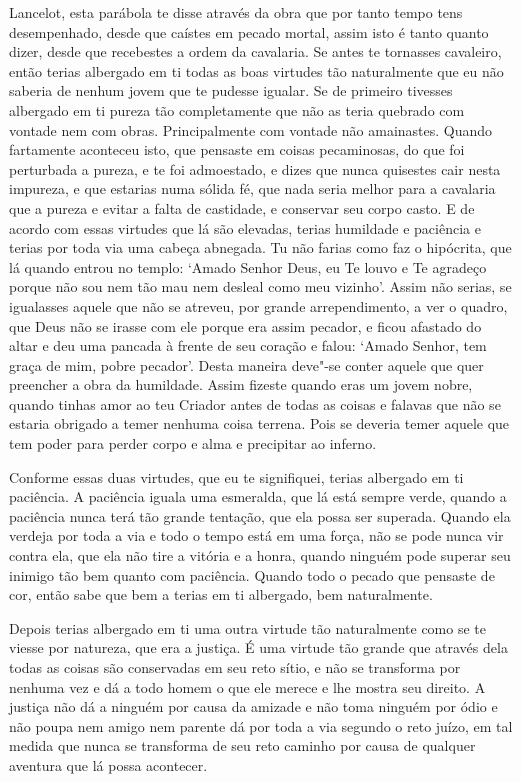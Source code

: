 Lancelot, esta parábola te disse através da obra que por tanto tempo tens
desempenhado, desde que caístes em pecado mortal, assim isto é tanto quanto
dizer, desde que recebestes a ordem da cavalaria. Se antes te tornasses
cavaleiro, então terias albergado em ti todas as boas virtudes tão naturalmente
que eu não saberia de nenhum jovem que te pudesse igualar. Se de primeiro
tivesses albergado em ti pureza tão completamente que não as teria quebrado com
vontade nem com obras. Principalmente com vontade não amainastes. Quando
fartamente aconteceu isto, que pensaste em coisas pecaminosas, do que foi
perturbada a pureza, e te foi admoestado, e dizes que nunca quisestes cair
nesta impureza, e que estarias numa sólida fé, que nada seria melhor para a
cavalaria que a pureza e evitar a falta de castidade, e conservar seu corpo
casto. E de acordo com essas virtudes que lá são elevadas, terias humildade e
paciência e terias por toda via uma cabeça abnegada. Tu não farias como faz o
hipócrita, que lá quando entrou no templo: ‘Amado Senhor Deus, eu Te louvo e Te
agradeço porque não sou nem tão mau nem desleal como meu vizinho’. Assim não
serias, se igualasses aquele que não se atreveu, por grande arrependimento, a
ver o quadro, que Deus não se irasse com ele porque era assim pecador, e ficou
afastado do altar e deu uma pancada à frente de seu coração e falou: ‘Amado
Senhor, tem graça de mim, pobre pecador’. Desta maneira deve"-se conter aquele
que quer preencher a obra da humildade. Assim fizeste quando eras um jovem
nobre, quando tinhas amor ao teu Criador antes de todas as coisas e falavas que
não se estaria obrigado a temer nenhuma coisa terrena. Pois se deveria temer
aquele que tem poder para perder corpo e alma e precipitar ao inferno.

Conforme essas duas virtudes, que eu te signifiquei, terias albergado em ti
paciência. A paciência iguala uma esmeralda, que lá está sempre verde, quando a
paciência nunca terá tão grande tentação, que ela possa ser superada. Quando
ela verdeja por toda a via e todo o tempo está em uma força, não se pode nunca
vir contra ela, que ela não tire a vitória e a honra, quando ninguém pode
superar seu inimigo tão bem quanto com paciência. Quando todo o pecado que
pensaste de cor, então sabe que bem a terias em ti albergado, bem naturalmente.

Depois terias albergado em ti uma outra virtude tão naturalmente como se te
viesse por natureza, que era a justiça. É uma virtude tão grande que através
dela todas as coisas são conservadas em seu reto sítio, e não se transforma por
nenhuma vez e dá a todo homem o que ele merece e lhe mostra seu direito. A
justiça não dá a ninguém por causa da amizade e não toma ninguém por ódio e não
poupa nem amigo nem parente dá por toda a via segundo o reto juízo, em tal
medida que nunca se transforma de seu reto caminho por causa de qualquer
aventura que lá possa acontecer.

